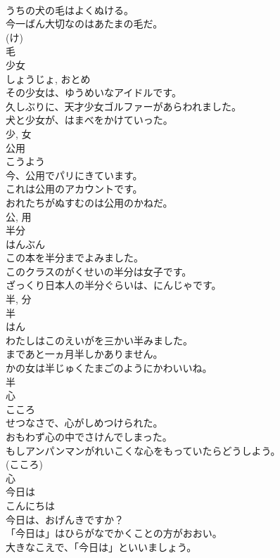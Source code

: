 \documentclass[8pt]{extreport}
\begin{document}
\begin{CJK}{UTF8}{min}
\\	うちの犬の毛はよくぬける。	
\\	今一ばん大切なのはあたまの毛だ。	
\\	(け) 
\\	毛	
\\	少女	
\\	しょうじょ, おとめ	
\\	その少女は、ゆうめいなアイドルです。	
\\	久しぶりに、天才少女ゴルファーがあらわれました。	
\\	犬と少女が、はまべをかけていった。	
\\	少, 女	
\\	公用	
\\	こうよう	
\\	今、公用でパリにきています。	
\\	これは公用のアカウントです。	
\\	おれたちがぬすむのは公用のかねだ。	
\\	公, 用	
\\	半分	
\\	はんぶん	
\\	この本を半分までよみました。	
\\	このクラスのがくせいの半分は女子です。	
\\	ざっくり日本人の半分ぐらいは、にんじゃです。	
\\	半, 分	
\\	半	
\\	はん	
\\	わたしはこのえいがを三かい半みました。	
\\	まであと一ヵ月半しかありません。	
\\	かの女は半じゅくたまごのようにかわいいね。	
\\	半	
\\	心	
\\	こころ	
\\	せつなさで、心がしめつけられた。	
\\	おもわず心の中でさけんでしまった。	
\\	もしアンパンマンがれいこくな心をもっていたらどうしよう。	
\\	(こころ) 
\\	心	
\\	今日は	
\\	こんにちは	
\\	今日は、おげんきですか？	
\\	「今日は」はひらがなでかくことの方がおおい。	
\\	大きなこえで、「今日は」といいましょう。	

\end{CJK}
\end{document}
